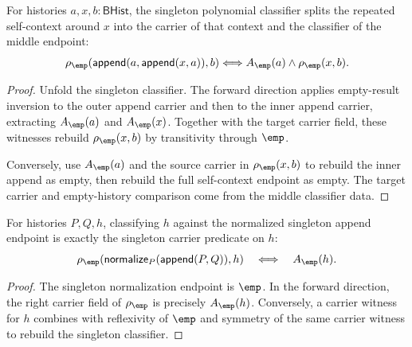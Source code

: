 \begin{theorem}
\label{thm:polynomial-singleton-classifier-self-context-split}
For histories $a,x,b:\mathsf{BHist}$, the singleton polynomial classifier
splits the repeated self-context around $x$ into the carrier of that context
and the classifier of the middle endpoint:
$$
\rho_{\emp}(\mathsf{append}(a,\mathsf{append}(x,a)),b)
\Longleftrightarrow
A_{\emp}(a)\land\rho_{\emp}(x,b).
$$
\end{theorem}
\begin{proof}
Unfold the singleton classifier. The forward direction applies empty-result
inversion to the outer append carrier and then to the inner append carrier,
extracting $A_{\emp}(a)$ and $A_{\emp}(x)$. Together with the target carrier
field, these witnesses rebuild $\rho_{\emp}(x,b)$ by transitivity through
$\emp$.

Conversely, use $A_{\emp}(a)$ and the source carrier in $\rho_{\emp}(x,b)$ to
rebuild the inner append as empty, then rebuild the full self-context endpoint
as empty. The target carrier and empty-history comparison come from the middle
classifier data.
\end{proof}

\begin{theorem}
\label{thm:polynomial-singleton-normalize-append-classifier-carrier-iff}
For histories $P,Q,h$, classifying $h$ against the normalized singleton append
endpoint is exactly the singleton carrier predicate on $h$:
$$
\rho_{\emp}(\mathsf{normalize}_P(\mathsf{append}(P,Q)),h)
\quad\Longleftrightarrow\quad
A_{\emp}(h).
$$
\end{theorem}
\begin{proof}
The singleton normalization endpoint is $\emp$. In the forward direction, the
right carrier field of $\rho_{\emp}$ is precisely $A_{\emp}(h)$. Conversely, a
carrier witness for $h$ combines with reflexivity of $\emp$ and symmetry of the
same carrier witness to rebuild the singleton classifier.
\end{proof}

